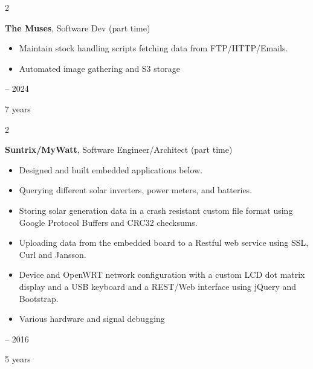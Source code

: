\documentclass[12pt, a4paper]{article}
\newenvironment{highlights}{
    \begin{itemize}[
        topsep=0.10 cm,
        parsep=0.10 cm,
        partopsep=0pt,
        itemsep=0pt,
        leftmargin=0.4 cm + 10pt
    ]
}{
    \end{itemize}
} %
\newenvironment{twocolentry}[2][]{
    \onecolentry
    \def\secondColumn{#2}
    \setcolumnwidth{\fill, 4.5 cm}
    \begin{paracol}{2}
}{
    \switchcolumn \raggedleft \secondColumn
    \end{paracol}
    \endonecolentry
} %
\begin{document}
        \vspace{0.2 cm}

        \begin{twocolentry}{
            2017 – 2024

        7 years
        }
            \textbf{The Muses}, Software Dev (part time)
            \begin{highlights}
                \item Maintain stock handling scripts fetching data from FTP/HTTP/Emails.
                \item Automated image gathering and S3 storage
            \end{highlights}
        \end{twocolentry}


        \vspace{0.2 cm}

        \begin{twocolentry}{
            2011 – 2016

        5 years
        }
            \textbf{Suntrix/MyWatt}, Software Engineer/Architect (part time)
            \begin{highlights}
                \item Designed and built embedded applications below.
                \item Querying different solar inverters, power meters, and batteries.
                \item Storing solar generation data in a crash resistant custom file format using Google Protocol Buffers and CRC32 checksums.
                \item Uploading data from the embedded board to a Restful web service using SSL, Curl and Jansson.
                \item Device and OpenWRT network configuration with a custom LCD dot matrix display and a USB keyboard and a REST/Web interface using jQuery and Bootstrap.
                \item Various hardware and signal debugging
            \end{highlights}
        \end{twocolentry}


        \vspace{0.2 cm}
\end{document}
